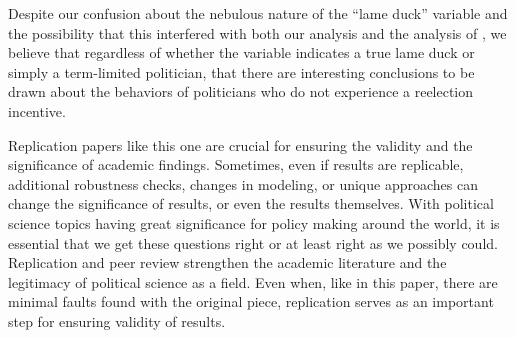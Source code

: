 \documentclass[12pt]{article}
\begin{document}
Despite our confusion about the nebulous nature of the ``lame duck''
variable and the possibility that this interfered with both our analysis
and the analysis of \citet{cooperman2021natural}, we believe that
regardless of whether the variable indicates a true lame duck or simply
a term-limited politician, that there are interesting conclusions to be
drawn about the behaviors of politicians who do not experience a
reelection incentive.

Replication papers like this one are crucial for ensuring the validity
and the significance of academic findings. Sometimes, even if results
are replicable, additional robustness checks, changes in modeling, or
unique approaches can change the significance of results, or even the
results themselves. With political science topics having great
significance for policy making around the world, it is essential that we
get these questions right or at least right as we possibly could.
Replication and peer review strengthen the academic literature and the
legitimacy of political science as a field. Even when, like in this
paper, there are minimal faults found with the original piece,
replication serves as an important step for ensuring validity of
results.

\newpage



\end{document}
